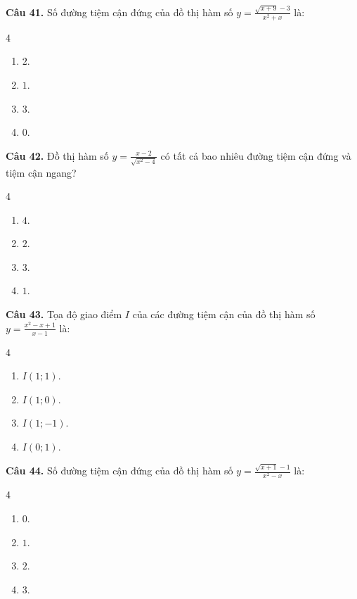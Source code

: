 \documentclass[12pt]{article}
\begin{document}
	\vspace{0.4cm}
	\noindent \textbf{Câu 41.} Số đường tiệm cận đứng của đồ thị hàm số $y = \frac{\sqrt{x+9} - 3}{x^2 + x}$ là:
	\begin{multicols}{4}
		\begin{enumerate}[label=\textbf{\Alph*.}]
			\item $2$.
			\item $1$.
			\item $3$.
			\item $0$.
		\end{enumerate}
	\end{multicols}
	
	\vspace{0.4cm}
	\noindent \textbf{Câu 42.} Đồ thị hàm số $y = \frac{x - 2}{\sqrt{x^2 - 4}}$ có tất cả bao nhiêu đường tiệm cận đứng và tiệm cận ngang?
	\begin{multicols}{4}
		\begin{enumerate}[label=\textbf{\Alph*.}]
			\item $4$.
			\item $2$.
			\item $3$.
			\item $1$.
		\end{enumerate}
	\end{multicols}
	
	\vspace{0.4cm}
	\noindent \textbf{Câu 43.} Tọa độ giao điểm $I$ của các đường tiệm cận của đồ thị hàm số $y = \frac{x^2 - x + 1}{x - 1}$ là:
	\begin{multicols}{4}
		\begin{enumerate}[label=\textbf{\Alph*.}]
			\item $I(1; 1)$.
			\item $I(1; 0)$.
			\item $I(1; -1)$.
			\item $I(0; 1)$.
		\end{enumerate}
	\end{multicols}
	
	\vspace{0.4cm}
	\noindent \textbf{Câu 44.} Số đường tiệm cận đứng của đồ thị hàm số $y = \frac{\sqrt{x+1} - 1}{x^2 - x}$ là:
	\begin{multicols}{4}
		\begin{enumerate}[label=\textbf{\Alph*.}]
			\item $0$.
			\item $1$.
			\item $2$.
			\item $3$.
		\end{enumerate}
	\end{multicols}
	
\end{document}
